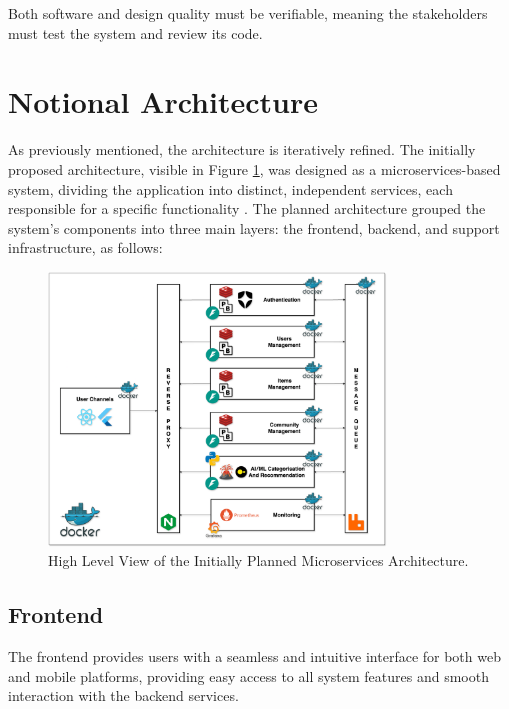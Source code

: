 Both software and design quality must be verifiable, meaning the stakeholders must test the system and review its code.


\section{Notional Architecture} \label{section:notional_architecture}

As previously mentioned, the architecture is iteratively refined. The initially proposed architecture, visible in Figure \ref{fig:initial_arch}, was designed as a microservices-based system, dividing the application into distinct, independent services, each responsible for a specific functionality \cite{Al-Debagy2021,Söylemez2024}. The planned architecture grouped the system's components into three main layers: the frontend, backend, and support infrastructure, as follows:

\begin{figure}[!htb]
    \includegraphics[width=0.8\textwidth]{figs/chapter3/initial_arch.png}
    \centering
    \caption[Initial Microservices Architecture]{High Level View of the Initially Planned Microservices Architecture.}
    \label{fig:initial_arch}
\end{figure}

\subsection{Frontend}

The frontend provides users with a seamless and intuitive interface for both web and mobile platforms, providing easy access to all system features and smooth interaction with the backend services.

